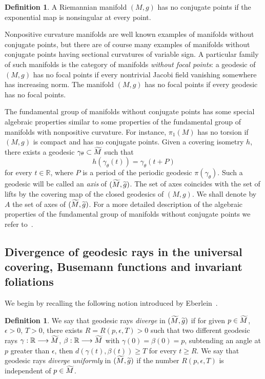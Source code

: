 \documentclass[10pt]{amsart}
\theoremstyle{definition}
\newtheorem{defi}[cdrthm]{Definition}
\newcommand{\bbR}{\mathbb{R}}
\let\oldtilde\tilde
\renewcommand*{\tilde}[1]{\mathchoice{\widetilde{#1}}{\widetilde{#1}}{\oldtilde{#1}}{\oldtilde{#1}}}
\begin{document}
\begin{defi}
A Riemannian manifold $(M,g)$ has no conjugate points if the exponential map is nonsingular at every point.
\end{defi}

Nonpositive curvature manifolds are well known examples of manifolds without conjugate points, but there are of course many examples of manifolds without conjugate points having sectional curvatures of variable sign. A particular family of such manifolds is the category of manifolds \emph{without focal points}: a geodesic of $(M,g)$ has no focal points if every nontrivial Jacobi field vanishing somewhere has increasing norm. The manifold $(M,g)$ has no focal points if every geodesic has no focal points.

The fundamental group of manifolds without conjugate points has some special algebraic properties similar to some properties of the fundamental group of manifolds with nonpositive curvature. For instance, $\pi_{1}(M)$ has no torsion if $(M,g)$ is compact and has no conjugate points. Given a covering isometry $h$, there exists a geodesic $\gamma_{\theta} \subset \tilde{M}$ such that
\[
h (\gamma_{\theta}(t)) = \gamma_{\theta}(t + P)
\]
for every $t \in \bbR$, where $P$ is a period of the periodic geodesic $\pi(\gamma_{\theta})$. Such a geodesic will be called an \emph{axis} of $(\tilde{M}, \tilde{g})$. The set of axes coincides with the set of lifts by the covering map of the closed geodesics of $(M,g)$. We shall denote by $A$ the set of axes of $(\tilde{M}, \tilde{g})$. For a more detailed description of the algebraic properties of the fundamental group of manifolds without conjugate points we refer to~\cite{kn:CS}.

\subsection{Divergence of geodesic rays in the universal covering, Busemann functions and invariant foliations}

We begin by recalling the following notion introduced by Eberlein~\cite{kn:Eberlein}.

\begin{defi}\label{divergence}
We say that geodesic rays \emph{diverge} in $(\tilde{M}, \tilde{g})$ if for given $p \in \tilde{M}$, $\epsilon >0$, $T>0$, there exists $R= R(p, \epsilon, T)>0$ such that two different geodesic rays $\gamma:\bbR \longrightarrow \tilde{M}$, $\beta : \bbR \longrightarrow \tilde{M}$ with $\gamma(0)= \beta(0) =p$, subtending an angle at $p$ greater than $\epsilon$, then $d(\gamma(t),\beta(t)) \geq T$ for every $t \geq R$. We say that geodesic rays \emph{diverge uniformly} in $(\tilde{M}, \tilde{g})$ if the number $R(p, \epsilon, T)$ is independent of $p \in \tilde{M}$.
\end{defi}
\end{document}
